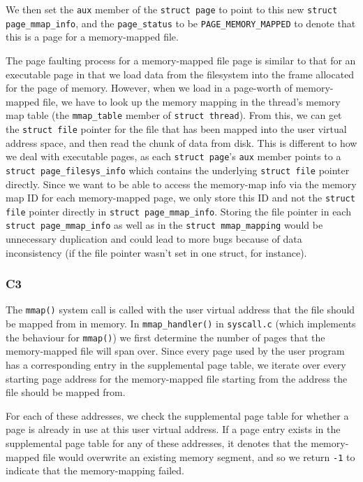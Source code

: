 \documentclass[a4wide, 11pt]{article}
\newcommand{\tx}{\texttt}
\begin{document}
We then set the \tx{aux} member of the \tx{struct page} to point to this new \tx{struct page\_mmap\_info}, and the \tx{page\_status} to be \tx{PAGE\_MEMORY\_MAPPED} to denote that this is a page for a memory-mapped file.

The page faulting process for a memory-mapped file page is similar to that for an executable page in that we load data from the filesystem into the frame allocated for the page of memory. However, when we load in a page-worth of memory-mapped file, we have to look up the memory mapping in the thread's memory map table (the \tx{mmap\_table} member of \tx{struct thread}). From this, we can get the \tx{struct file} pointer for the file that has been mapped into the user virtual address space, and then read the chunk of data from disk. This is different to how we deal with executable pages, as each \tx{struct page}'s \tx{aux} member points to a \tx{struct page\_filesys\_info} which contains the underlying \tx{struct file} pointer directly. Since we want to be able to access the memory-map info via the memory map ID for each memory-mapped page, we only store this ID and not the \tx{struct file} pointer directly in \tx{struct page\_mmap\_info}. Storing the file pointer in each \tx{struct page\_mmap\_info} as well as in the \tx{struct mmap\_mapping} would be unnecessary duplication and could lead to more bugs because of data inconsistency (if the file pointer wasn't set in one struct, for instance).

\subsubsection{C3}

The \tx{mmap()} system call is called with the user virtual address that the file should be mapped from in memory. In \tx{mmap\_handler()} in \tx{syscall.c} (which implements the behaviour for \tx{mmap()}) we first determine the number of pages that the memory-mapped file will span over. Since every page used by the user program has a corresponding entry in the supplemental page table, we iterate over every starting page address for the memory-mapped file starting from the address the file should be mapped from.

For each of these addresses, we check the supplemental page table for whether a page is already in use at this user virtual address. If a page entry exists in the supplemental page table for any of these addresses, it denotes that the memory-mapped file would overwrite an existing memory segment, and so we return \tx{-1} to indicate that the memory-mapping failed.
\end{document}
